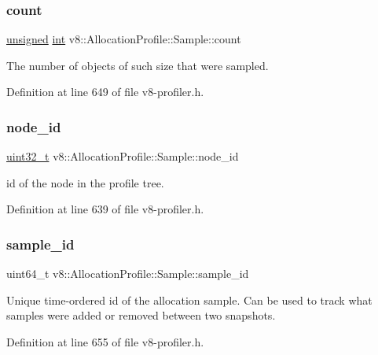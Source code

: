 \subsubsection{\texorpdfstring{count}{count}}
{\footnotesize\ttfamily \mbox{\hyperlink{classunsigned}{unsigned}} \mbox{\hyperlink{classint}{int}} v8\+::\+Allocation\+Profile\+::\+Sample\+::count}

The number of objects of such size that were sampled. 

Definition at line 649 of file v8-\/profiler.\+h.

\mbox{\label{structv8_1_1AllocationProfile_1_1Sample_ab84cfd942c2b6d42f25874b5008cfc35}} 
\subsubsection{\texorpdfstring{node\+\_\+id}{node\_id}}
{\footnotesize\ttfamily \mbox{\hyperlink{classuint32__t}{uint32\+\_\+t}} v8\+::\+Allocation\+Profile\+::\+Sample\+::node\+\_\+id}

id of the node in the profile tree. 

Definition at line 639 of file v8-\/profiler.\+h.

\mbox{\label{structv8_1_1AllocationProfile_1_1Sample_afc21641115d4a9684363ac873750422c}} 
\subsubsection{\texorpdfstring{sample\+\_\+id}{sample\_id}}
{\footnotesize\ttfamily uint64\+\_\+t v8\+::\+Allocation\+Profile\+::\+Sample\+::sample\+\_\+id}

Unique time-\/ordered id of the allocation sample. Can be used to track what samples were added or removed between two snapshots. 

Definition at line 655 of file v8-\/profiler.\+h.

\mbox{\label{structv8_1_1AllocationProfile_1_1Sample_aa8775ce782c6fcc5a20922f604190dd5}} 
